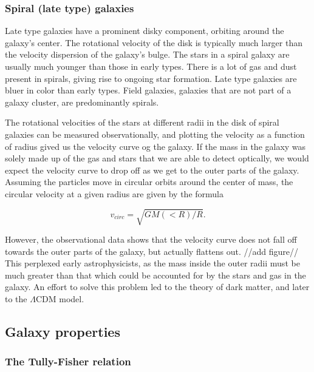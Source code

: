 \subsubsection{Spiral (late type) galaxies}
Late type galaxies have a prominent disky component, orbiting around the galaxy's center. The rotational velocity of the disk is typically much larger than the velocity dispersion of the galaxy's bulge. The stars in a spiral galaxy are usually much younger than those in early types. There is a lot of gas and dust present in spirals, giving rise to ongoing star formation. Late type galaxies are bluer in color than early types. Field galaxies, galaxies that are not part of a galaxy cluster, are predominantly spirals. 


The rotational velocities of the stars at different radii in the disk of spiral galaxies can be measured observationally, and plotting the velocity as a function of radius gived us the velocity curve og the galaxy. If the mass in the galaxy was solely made up of the gas and stars that we are able to detect optically, we would expect the velocity curve to drop off as we get to the outer parts of the galaxy. Assuming the particles move in circular orbits around the center of mass, the circular velocity at a given radius are given by the formula

\begin{equation}
    v_{circ} = \sqrt{GM(<R)/R}. 
\end{equation}

However, the observational data shows that the velocity curve does not fall off towards the outer parts of the galaxy, but actually flattens out. //add figure// This perplexed early astrophysicists, as the mass inside the outer radii must be much greater than that which could be accounted for by the stars and gas in the galaxy. An effort to solve this problem led to the theory of dark matter, and later to the $\Lambda$CDM model.


\subsection{Galaxy properties}


\subsubsection{The Tully-Fisher relation}

